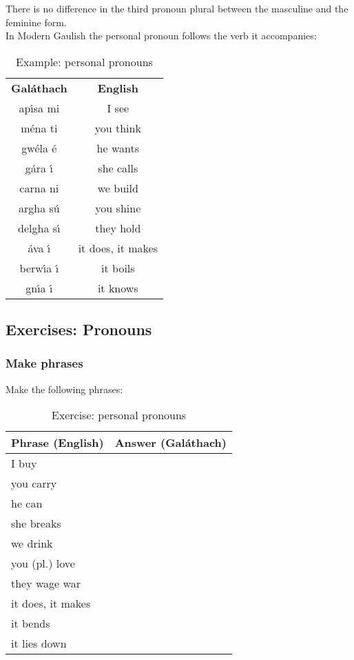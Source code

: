 There is no difference in the third pronoun plural between the masculine and the feminine form.\\

In Modern Gaulish the personal pronoun follows the verb it accompanies:
\begin{table}[H]
\centering
\begin{tabular}{cc}
  \toprule
  \textbf{Gal\'{a}thach} & \textbf{English}\\
  \cmidrule(lr){1-1}\cmidrule{2-2}
  ap\'{\i}sa mi & I see\\
  m\'{e}na ti & you think\\
  gw\'{e}la \'{e} & he wants\\
  g\'{a}ra \'{\i} & she calls\\
  carna ni & we build\\
  argha s\'{u} & you shine\\
  delgha s\'{\i} & they hold\\
  \'{a}va \'{\i} & it  does, it makes\\
  berw\'{\i}a \'{\i} & it boils\\
  gn\'{\i}a \'{\i} & it knows\\
  \bottomrule
\end{tabular}
\caption{Example: personal pronouns}
\label{example_personal_pronoun}
\end{table}

\newpage
\subsection{Exercises: Pronouns}

\subsubsection{Make phrases}

Make the following phrases:\\
\begin{table}[H]
\centering
\begin{tabular}{|l|M{10.0cm}|}
  \toprule
  \textbf{Phrase (English)} & \textbf{Answer (Gal\'{a}thach)}\\
  \toprule
  I buy & \\
  \midrule
  you carry & \\
  \midrule
  he can & \\
  \midrule
  she breaks & \\
  \midrule
  we drink & \\
  \midrule
  you (pl.) love & \\
  \midrule
  they wage war & \\
  \midrule
  it does, it makes & \\
  \midrule
  it bends & \\
  \midrule
  it lies down & \\
  \bottomrule
\end{tabular}
\label{exercise_personal_pronouns}
\caption{Exercise: personal pronouns}
\end{table}

